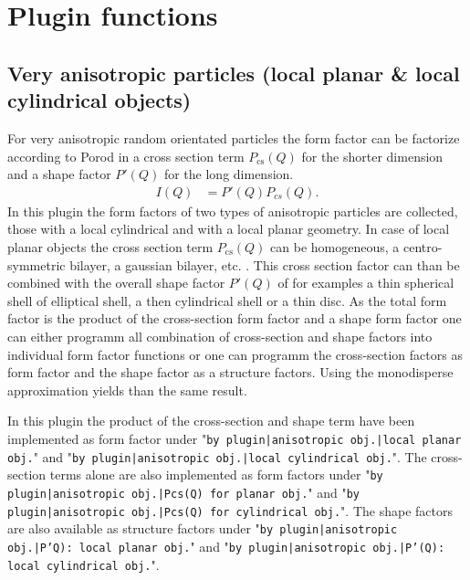\chapter{Plugin functions}
\label{ch:plugins}


\section{Very anisotropic particles (local planar \& local cylindrical objects)}

For very anisotropic random orientated particles the form factor
can be factorize according to Porod \cite{Porod1948} in a cross
section term $P_\text{cs}(Q)$ for the shorter dimension and a
shape factor $P'(Q)$ for the long dimension.
\begin{align}
I(Q) &=P'(Q) P_{cs}(Q).
\end{align}
In this plugin the form factors of two types of anisotropic
particles are collected, those with a local cylindrical and with a
local planar geometry. In case of local planar objects the cross
section term $P_\text{cs}(Q)$ can be homogeneous, a
centro-symmetric bilayer, a gaussian bilayer, etc. . This cross
section factor can than be combined with the overall shape factor
$P'(Q)$ of for examples a thin spherical shell of elliptical
shell, a then cylindrical shell or a thin disc. As the total form
factor is the product of the cross-section form factor and a shape
form factor one can either programm all combination of
cross-section and shape factors into individual form factor
functions or one can programm the cross-section factors as form
factor and the shape factor as a structure factors. Using the
monodisperse approximation yields than the same result.

In this plugin the product of the cross-section and shape term
have been implemented as form factor under "\texttt{by
plugin|anisotropic obj.|local planar obj.}" and "\texttt{by
plugin|anisotropic obj.|local cylindrical obj.}". The
cross-section terms alone are also implemented as form factors
under "\texttt{by plugin|anisotropic obj.|Pcs(Q) for planar obj.}"
and "\texttt{by plugin|anisotropic obj.|Pcs(Q) for cylindrical
obj.}". The shape factors are also available as structure factors
under "\texttt{by plugin|anisotropic obj.|P'Q): local planar
obj.}" and "\texttt{by plugin|anisotropic obj.|P'(Q): local
cylindrical obj.}".

